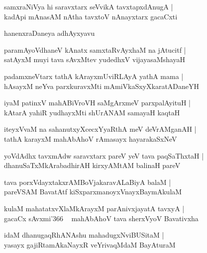 \documentclass[twoside,12pt,openright]{book}
\newcounter{shloka}[chapter]
\begin{document}
\begin{shloka}%
samxraNiVya hi saravxtarx seVvikA tavxtapxdAnugA |\\
kadApi mAnasAM nAtha tavxtoV nAnayxtarx gacaCxti
\end{shloka}

\begin{center}
hanenxraDaneya adhAyxyavu
\end{center}

\begin{shloka}%
paramAyoVdhaneV kAnatx samxtaRvAyxhaM na jAtucitf |\\
satAyxM muyi tava sAvxMtev yudedhxV vijayasaMshayaH 
\end{shloka}

\begin{shloka}%
padamxneVtarx tathA kArayxmUviRLAyA yathA mama |\\
hAsayxM neYva parxkuravxMti mAmiVkaSxyXkaratADaneYH
\end{shloka}

\begin{shloka}%
iyaM patinxV mahABiVroVH saMgArxmeV parxpalAyituH |\\
kAtarA yahiR yudhayxMti shUrANAM samayaH kaqtaH 
\end{shloka}

\begin{shloka}%
iteyxVvaM na sahanutxyXcecxYyaRthA  meV deVrAMganAH |\\
tathA karayxM mahAbAhoV rAmasayx hayarakaSxNeV 
\end{shloka}

\begin{shloka}%
yoVdAdhx tavxmAdw saravxtarx pareV yeV tava paqSaThxtaH |\\
dhanuSaTxMkArabadhirAH kirxyAMtAM balinaH pareV
\end{shloka}

\begin{shloka}%
tava porxVdayxtakxrAMBoVjakaravALaBiyA balaM |\\
pareVSAM BavatAtf kiSxparxmanoyxVnayxBaymAkulaM
\end{shloka}

\begin{shloka}%
kulaM mahatatxvXlaMkArayxM parAnivxjayatA tavxyA |\\
gacaCx sAvxmi\char'366 ~ mahAbAhoV tava sherxVyoV Bavativxha 
\end{shloka}

\begin{shloka}%
idaM dhanugaqRhANAshu mahadugxNviBUSitaM |\\
yasayx gajiRtamAkaNayxR veYrivaqMdaM BayAturaM 
\end{shloka}
\end{document}
